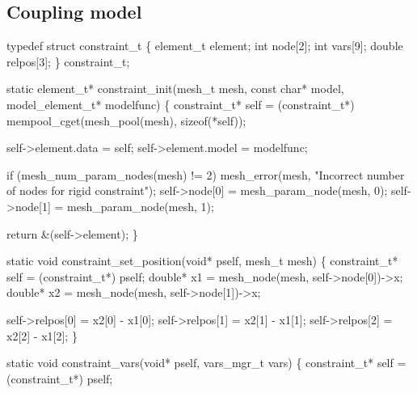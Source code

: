 \nwendcode{}\nwdocspar


\subsection{Coupling model}

\nwenddocs{}\plusendmoddef
typedef struct constraint_t \{
    element_t element;
    int node[2];
    int vars[9];
    double relpos[3];
\} constraint_t;

\nwendcode{}\nwdocspar

\nwenddocs{}\plusendmoddef
static element_t* constraint_init(mesh_t mesh, const char* model,
                                  model_element_t* modelfunc)
\{
    constraint_t* self = (constraint_t*) 
        mempool_cget(mesh_pool(mesh), sizeof(*self));

    self->element.data = self;
    self->element.model = modelfunc;

    if (mesh_num_param_nodes(mesh) != 2)
        mesh_error(mesh, "Incorrect number of nodes for rigid constraint");
    self->node[0] = mesh_param_node(mesh, 0);
    self->node[1] = mesh_param_node(mesh, 1);

    return &(self->element);
\}

\nwendcode{}\nwdocspar

\nwenddocs{}\plusendmoddef
static void constraint_set_position(void* pself, mesh_t mesh)
\{
    constraint_t* self = (constraint_t*) pself;
    double* x1 = mesh_node(mesh, self->node[0])->x;
    double* x2 = mesh_node(mesh, self->node[1])->x;

    self->relpos[0] = x2[0] - x1[0];
    self->relpos[1] = x2[1] - x1[1];
    self->relpos[2] = x2[2] - x1[2];
\}

\nwendcode{}\nwdocspar

\nwenddocs{}\plusendmoddef
static void constraint_vars(void* pself, vars_mgr_t vars)
\{
    constraint_t* self = (constraint_t*) pself;


